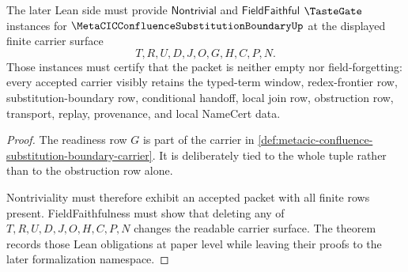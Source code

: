 \begin{theorem}
\label{thm:metacic-confluence-substitution-boundary-tastegate-readiness}
The later Lean side must provide $\mathsf{Nontrivial}$ and $\mathsf{FieldFaithful}$ $\TasteGate$ instances for $\MetaCICConfluenceSubstitutionBoundaryUp$ at the displayed finite carrier surface
$$
T,R,U,D,J,O,G,H,C,P,N .
$$
Those instances must certify that the packet is neither empty nor field-forgetting: every accepted carrier visibly retains the typed-term window, redex-frontier row, substitution-boundary row, conditional handoff, local join row, obstruction row, transport, replay, provenance, and local NameCert data.
\end{theorem}
\begin{proof}
The readiness row $G$ is part of the carrier in \autoref{def:metacic-confluence-substitution-boundary-carrier}. It is deliberately tied to the whole tuple rather than to the obstruction row alone.

Nontriviality must therefore exhibit an accepted packet with all finite rows present. FieldFaithfulness must show that deleting any of $T,R,U,D,J,O,H,C,P,N$ changes the readable carrier surface. The theorem records those Lean obligations at paper level while leaving their proofs to the later formalization namespace.
\end{proof}



